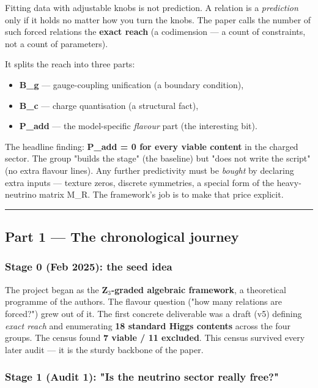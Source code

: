 \documentclass[11pt]{article}
\begin{document}
Fitting data with adjustable knobs is not prediction. A relation is a \emph{prediction}
only if it holds no matter how you turn the knobs. The paper calls the number of
such forced relations the \textbf{exact reach} (a codimension --- a count of constraints,
not a count of parameters).

It splits the reach into three parts:
\begin{itemize}
\item \textbf{B\_g} --- gauge-coupling unification (a boundary condition),
\item \textbf{B\_c} --- charge quantisation (a structural fact),
\item \textbf{P\_add} --- the model-specific \emph{flavour} part (the interesting bit).
\end{itemize}

The headline finding: \textbf{P\_add = 0 for every viable content} in the charged sector.
The group "builds the stage" (the baseline) but "does not write the script" (no
extra flavour lines). Any further predictivity must be \emph{bought} by declaring extra
inputs --- texture zeros, discrete symmetries, a special form of the heavy-neutrino
matrix M\_R. The framework's job is to make that price explicit.

\vspace{4pt}\hrule\vspace{4pt}

\subsection*{Part 1 --- The chronological journey}

\subsubsection*{Stage 0 (Feb 2025): the seed idea}

The project began as the \textbf{Z$_3$-graded algebraic framework}, a theoretical programme
of the authors. The flavour question ("how many relations are forced?") grew out of
it. The first concrete deliverable was a draft (v5) defining \emph{exact reach} and
enumerating \textbf{18 standard Higgs contents} across the four groups. The census found
\textbf{7 viable / 11 excluded}. This census survived every later audit --- it is the
sturdy backbone of the paper.

\subsubsection*{Stage 1 (Audit 1): "Is the neutrino sector really free?"}
\end{document}
